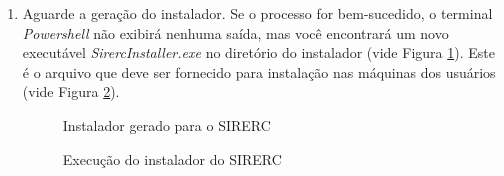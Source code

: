 \documentclass[a4paper,11pt]{article}
\newcommand{\sistema}{\textsf{SIRERC}}
\begin{document}
\begin{enumerate}
\begin{enumerate}
		\item Aguarde a geração do instalador. Se o processo for bem-sucedido, o terminal \emph{Powershell} não exibirá nenhuma saída, mas você encontrará um novo executável \emph{SirercInstaller.exe} no diretório do instalador (vide Figura \ref{fig:sirercinstallerfinish}). Este é o arquivo que deve ser fornecido para instalação nas máquinas dos usuários (vide Figura \ref{fig:sirercinstaller}).
		
		\begin{figure}[H]\centering
			\caption{Instalador gerado para o \sistema{}}\label{fig:sirercinstallerfinish}
		\end{figure}
		
		\begin{figure}[H]\centering
			\caption{Execução do instalador do \sistema{}}\label{fig:sirercinstaller}
		\end{figure}
	\end{enumerate}
\end{enumerate}
\end{document}
